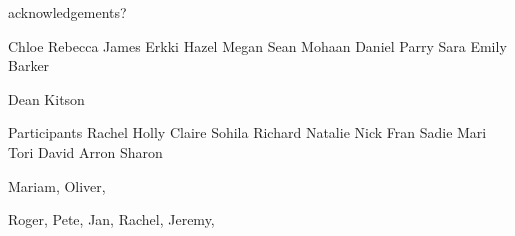
\begin{dedication} 







acknowledgements?

Chloe
Rebecca
James
Erkki
Hazel
Megan
Sean
Mohaan
Daniel Parry
Sara
Emily Barker


Dean
Kitson

Participants
Rachel
Holly
Claire
Sohila
Richard
Natalie
Nick
Fran
Sadie
Mari
Tori
David
Arron
Sharon

Mariam, Oliver, 

Roger, Pete, Jan, Rachel, Jeremy, 

\end{dedication}

